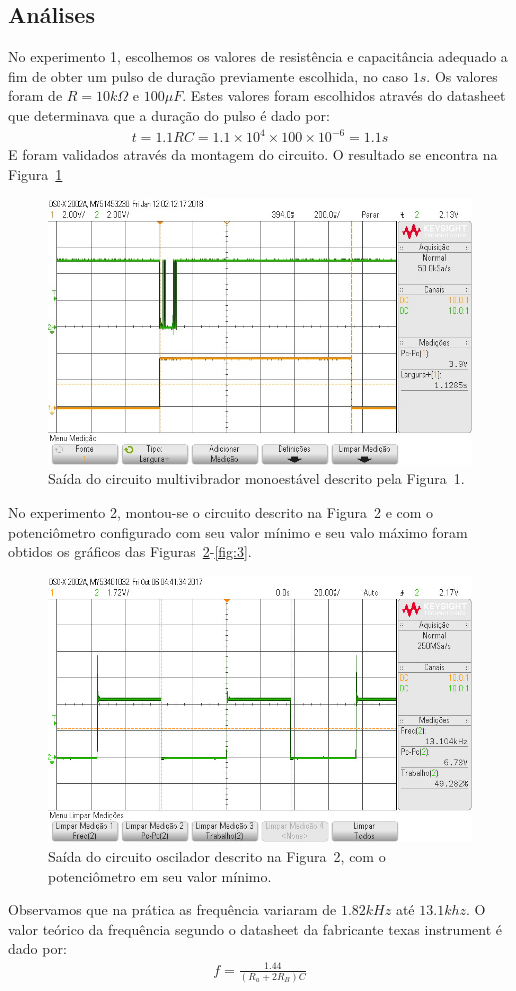 \documentclass[12pt,a4paper]{article}
\begin{document}
\subsection{Análises}
No experimento 1, escolhemos os valores de resistência  e capacitância adequado a fim de obter um pulso de duração previamente escolhida, no caso $1s$. Os valores foram de $R=10k \Omega$ e $100\mu F$. Estes valores foram escolhidos através do datasheet que determinava que a duração do pulso é dado por:
\begin{align*}
  t= 1.1 R C = 1.1 \times 10^{4} \times 100\times10^{-6}= 1.1 s
\end{align*}
E foram validados através da montagem do circuito.   O resultado se encontra na Figura~\ref{fig:1}
\begin{figure}[htpb]
  \centering
  \includegraphics[width=0.8\linewidth]{img/exp1.jpg}
  \caption{Saída do circuito multivibrador monoestável descrito pela Figura~1.}
  \label{fig:1}
\end{figure}

No experimento 2, montou-se o circuito descrito na Figura~2 e com o potenciômetro configurado com seu valor mínimo e seu valo máximo foram obtidos os gráficos das Figuras~\ref{fig:2}-\ref{fig:3}.
\begin{figure}[htpb]
  \centering
  \includegraphics[width=0.8\linewidth]{img/max.jpg}
  \caption{Saída do circuito oscilador descrito na Figura~2, com o potenciômetro em seu valor mínimo. }
  \label{fig:2}
\end{figure}
Observamos que na prática as frequência variaram de $1.82 kHz$ até $13.1khz$. O valor teórico da frequência segundo o datasheet da fabricante texas instrument é dado por:
\begin{align}
  \label{eq:0}
  f= \frac{1.44 }{ \left( R_a + 2 R_B  \right) C } 
\end{align}
\end{document}
